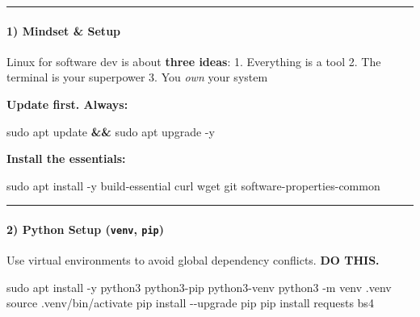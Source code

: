 \documentclass[
  english,
  paper=a4,
  oneside  ,captions=tableheading
]{scrartcl}
\newenvironment{Shaded}{}{}
\newcommand{\AttributeTok}[1]{\textcolor[rgb]{0.49,0.56,0.16}{#1}}
\newcommand{\BuiltInTok}[1]{\textcolor[rgb]{0.00,0.50,0.00}{#1}}
\newcommand{\ExtensionTok}[1]{#1}
\newcommand{\FunctionTok}[1]{\textcolor[rgb]{0.02,0.16,0.49}{#1}}
\newcommand{\KeywordTok}[1]{\textcolor[rgb]{0.00,0.44,0.13}{\textbf{#1}}}
\newcommand{\NormalTok}[1]{#1}
\begin{document}
\begin{center}\rule{0.5\linewidth}{0.5pt}\end{center}

\paragraph{1) Mindset \& Setup}\label{mindset-setup}

Linux for software dev is about \textbf{three ideas}: 1. Everything is a
tool 2. The terminal is your superpower 3. You \emph{own} your system

\textbf{Update first. Always:}

\begin{Shaded}
\begin{Highlighting}[]
\FunctionTok{sudo}\NormalTok{ apt update }\KeywordTok{\&\&} \FunctionTok{sudo}\NormalTok{ apt upgrade }\AttributeTok{{-}y}
\end{Highlighting}
\end{Shaded}

\textbf{Install the essentials:}

\begin{Shaded}
\begin{Highlighting}[]
\FunctionTok{sudo}\NormalTok{ apt install }\AttributeTok{{-}y}\NormalTok{ build{-}essential curl wget git software{-}properties{-}common}
\end{Highlighting}
\end{Shaded}

\begin{center}\rule{0.5\linewidth}{0.5pt}\end{center}

\paragraph{\texorpdfstring{2) Python Setup (\texttt{venv},
\texttt{pip})}{2) Python Setup (venv, pip)}}\label{python-setup-venv-pip}

Use virtual environments to avoid global dependency conflicts.
\textbf{DO THIS.}

\begin{Shaded}
\begin{Highlighting}[]
\FunctionTok{sudo}\NormalTok{ apt install }\AttributeTok{{-}y}\NormalTok{ python3 python3{-}pip python3{-}venv}
\ExtensionTok{python3} \AttributeTok{{-}m}\NormalTok{ venv .venv}
\BuiltInTok{source}\NormalTok{ .venv/bin/activate}
\ExtensionTok{pip}\NormalTok{ install }\AttributeTok{{-}{-}upgrade}\NormalTok{ pip}
\ExtensionTok{pip}\NormalTok{ install requests bs4}
\end{Highlighting}
\end{Shaded}
\end{document}
